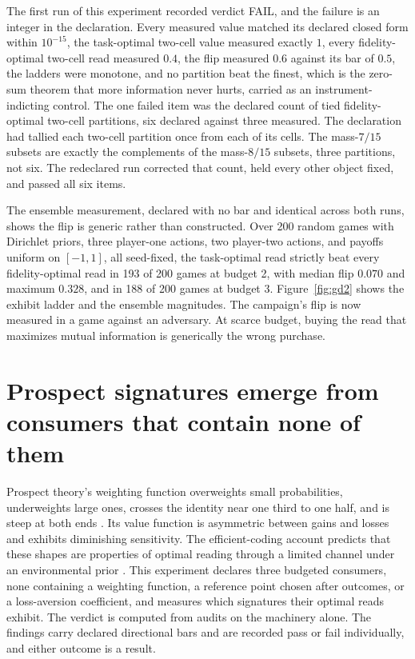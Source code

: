 \documentclass[aps,pre,reprint,nofootinbib]{revtex4-2}
\begin{document}
The first run of this experiment recorded verdict FAIL, and the
failure is an integer in the declaration.  Every measured value
matched its declared closed form within $10^{-15}$, the task-optimal
two-cell value measured exactly $1$, every fidelity-optimal two-cell
read measured $0.4$, the flip measured $0.6$ against its bar of
$0.5$, the ladders were monotone, and no partition beat the finest,
which is the zero-sum theorem that more information never hurts,
carried as an instrument-indicting control.  The one failed item was
the declared count of tied fidelity-optimal two-cell partitions, six
declared against three measured.  The declaration had tallied each
two-cell partition once from each of its cells.  The mass-$7/15$
subsets are exactly the complements of the mass-$8/15$ subsets, three
partitions, not six.  The redeclared run corrected that count, held
every other object fixed, and passed all six items.

The ensemble measurement, declared with no bar and identical across
both runs, shows the flip is generic rather than constructed.  Over
200 random games with Dirichlet priors, three player-one actions,
two player-two actions, and payoffs uniform on $[-1,1]$, all
seed-fixed, the task-optimal read strictly beat every
fidelity-optimal read in 193 of 200 games at budget 2, with median
flip $0.070$ and maximum $0.328$, and in 188 of 200 games at budget
3.  Figure~\ref{fig:gd2} shows the exhibit ladder and the ensemble
magnitudes.  The campaign's flip is now measured in a game against
an adversary.  At scarce budget, buying the read that maximizes
mutual information is generically the wrong purchase.

\section{Prospect signatures emerge from consumers that contain
none of them}
\label{sec:gd3}

Prospect theory's weighting function overweights small probabilities,
underweights large ones, crosses the identity near one third to one
half, and is steep at both ends \cite{KahnemanTversky1979,
TverskyKahneman1992}.  Its value function is asymmetric between
gains and losses and exhibits diminishing sensitivity.  The
efficient-coding account predicts that these shapes are properties of
optimal reading through a limited channel under an environmental
prior \cite{ZhangMaloney2012, FrydmanJin2022}.  This experiment
declares three budgeted consumers, none containing a weighting
function, a reference point chosen after outcomes, or a
loss-aversion coefficient, and measures which signatures their
optimal reads exhibit.  The verdict is computed from audits on the
machinery alone.  The findings carry declared directional bars and
are recorded pass or fail individually, and either outcome is a
result.
\end{document}
